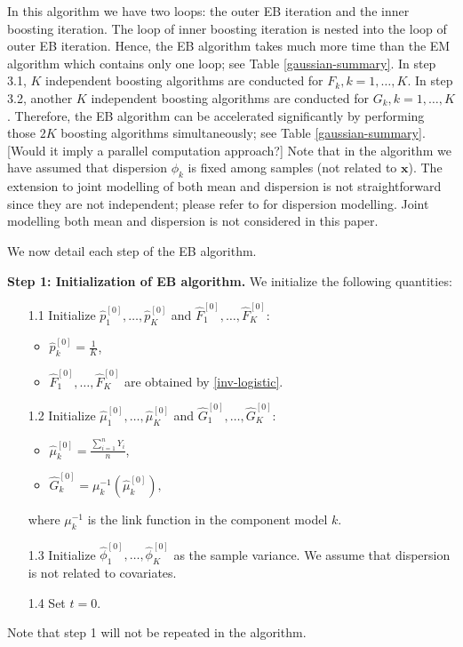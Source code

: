 \documentclass[11pt]{article}
\numberwithin{equation}{section}
\def\bx{\boldsymbol{x}}
\begin{document}
In this algorithm we have two loops: the outer EB iteration and the inner boosting iteration.
The loop of inner boosting iteration is nested into the loop of outer EB iteration.
Hence, the EB algorithm takes much more time than the EM algorithm which contains only one loop; see Table \ref{gaussian-summary}.
In step 3.1, $K$ independent boosting algorithms are conducted for $F_k, k=1,\ldots,K$.
In step 3.2,  another $K$ independent boosting algorithms are conducted for $G_k, k=1,\ldots,K$.
Therefore, the EB algorithm can be accelerated significantly by performing those $2K$ boosting algorithms simultaneously; see Table \ref{gaussian-summary}. {\color{blue}[Would it imply a parallel computation approach?]}
Note that  in the algorithm we have assumed that dispersion $\phi_k$ is fixed among samples (not related to $\bx$). The extension to joint modelling of both mean and dispersion  is not straightforward since they are not independent; please refer to \citet{jorgensen:1997} for dispersion modelling.
Joint modelling both mean and dispersion is not considered in this paper. 

We now detail each step of the EB algorithm.

{\bf Step 1: Initialization of EB algorithm.} We initialize the following quantities:
	\begin{enumerate}
		\item[1.1] Initialize $\hat{p}_1^{[0]}, \ldots,\hat{p}_K^{[0]}$ and   $\hat{F}_1^{[0]}, \ldots, \hat{F}_{K}^{[0]}$:
		
		\begin{itemize}
			\item 	$\hat{p}_k^{[0]}=\frac{1}{K}$,
			\item $\hat{F}_1^{[0]}, \ldots, \hat{F}_{K}^{[0]}$ are obtained by \eqref{inv-logistic}.
		\end{itemize}
		\item[1.2]
		Initialize $\hat{\mu}_1^{[0]},\ldots,\hat{\mu}_K^{[0]}$ and  $\hat{G}_1^{[0]},\ldots,\hat{G}_K^{[0]}$:
		\begin{itemize}
			\item $\hat{\mu}_k^{[0]}=\frac{\sum_{i=1}^nY_i}{n}$,
			\item $\hat{G}_k^{[0]}=\mu_k^{-1}(\hat{\mu}_k^{[0]}),$
		\end{itemize}
	where $\mu^{-1}_k$ is the link function in the component model $k$.
		\item[1.3] Initialize $\hat{\phi}_1^{[0]},\ldots, \hat{\phi}_K^{[0]}$ as the sample variance. We assume that dispersion is not related to covariates.
		\item[1.4] 	Set $t=0$.
	\end{enumerate}
Note that step 1 will not be repeated in the algorithm.	
\end{document}
